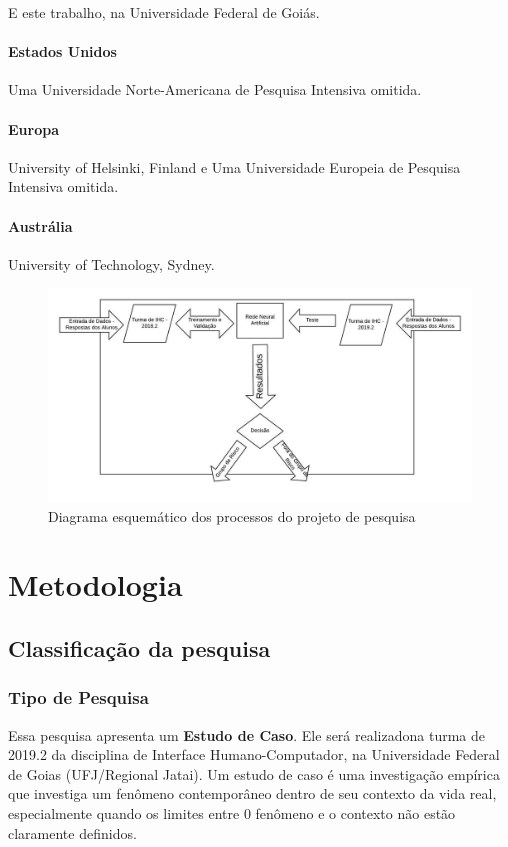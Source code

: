 \documentclass[
	12pt,				%
	openright,			%
	oneside,
	a4paper,			%
	english,			%
	french,				%
	spanish,			%
	brazil,				%
	]{abntex2}
\begin{document}
E este trabalho, na Universidade Federal de Goiás.

\subsubsection{Estados Unidos}
\label{sec:EUA}
Uma Universidade Norte-Americana de Pesquisa Intensiva omitida.

\subsubsection{Europa}
\label{sec:EUR}
University of Helsinki, Finland e Uma Universidade Europeia de Pesquisa Intensiva omitida.

\subsubsection{Austrália}
\label{sec:Aus}
University of Technology, Sydney.

\begin{figure}
    \centering
    \includegraphics[width=1.1\textwidth]{Modelo_Projeto_Pesquisa_UFG_REJ_BCC/Diagrama.jpeg}
    \caption{Diagrama esquemático dos processos do projeto de pesquisa}
    \label{fig:my_label}
\end{figure}

\chapter{Metodologia}

\section{Classificação da pesquisa}

\subsection{Tipo de Pesquisa}
Essa pesquisa apresenta um \textbf{Estudo de Caso}. Ele será realizadona turma de 2019.2 da disciplina de Interface Humano-Computador, na Universidade Federal de Goias (UFJ/Regional Jatai). Um estudo de caso é uma investigação empírica que investiga um fenômeno contemporâneo dentro de seu contexto da vida real, especialmente quando os limites entre 0 fenômeno e o contexto não estão claramente definidos. \cite{yin2001planejamento}
\end{document}
